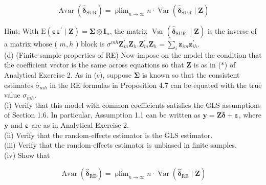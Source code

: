 \documentclass[10pt]{article}
\begin{document}
$$
\operatorname{Avar}\left(\hat{\boldsymbol{\delta}}_{\mathrm{SUR}}\right)=\operatorname{plim}_{n \rightarrow \infty} n \cdot \operatorname{Var}\left(\hat{\boldsymbol{\delta}}_{\mathrm{SUR}} \mid \mathbf{Z}\right)
$$

Hint: With $\mathrm{E}\left(\boldsymbol{\varepsilon \varepsilon ^ { \prime }} \mid \mathbf{Z}\right)=\boldsymbol{\Sigma} \otimes \mathbf{I}_{n}$, the matrix $\operatorname{Var}\left(\hat{\boldsymbol{\delta}}_{\text {SUR }} \mid \mathbf{Z}\right)$ is the inverse of a matrix whose ( $m, h$ ) block is $\sigma^{m h} \mathbf{Z}_{m}^{\prime} \mathbf{Z}_{h} . \mathbf{Z}_{m}^{\prime} \mathbf{Z}_{h}=\sum_{i} \mathbf{z}_{i m} \mathbf{z}_{i h}^{\prime}$.\\
(d) (Finite-sample properties of RE) Now impose on the model the condition that the coefficient vector is the same across equations so that $\mathbf{Z}$ is as in (*) of Analytical Exercise 2. As in (c), suppose $\boldsymbol{\Sigma}$ is known so that the consistent estimates $\hat{\sigma}_{m h}$ in the RE formulas in Proposition 4.7 can be equated with the true value $\sigma_{m h}$.\\
(i) Verify that this model with common coefficients satisfies the GLS assumptions of Section 1.6. In particular, Assumption 1.1 can be written as $\mathbf{y}=\mathbf{Z} \boldsymbol{\delta}+\boldsymbol{\varepsilon}$, where $\mathbf{y}$ and $\boldsymbol{\varepsilon}$ are as in Analytical Exercise 2.\\
(ii) Verify that the random-effects estimator is the GLS estimator.\\
(iii) Verify that the random-effects estimator is unbiased in finite samples.\\
(iv) Show that

$$
\operatorname{Avar}\left(\hat{\boldsymbol{\delta}}_{\mathrm{RE}}\right)=\operatorname{plim}_{n \rightarrow \infty} n \cdot \operatorname{Var}\left(\hat{\boldsymbol{\delta}}_{\mathrm{RE}} \mid \mathbf{Z}\right)
$$
\end{document}
